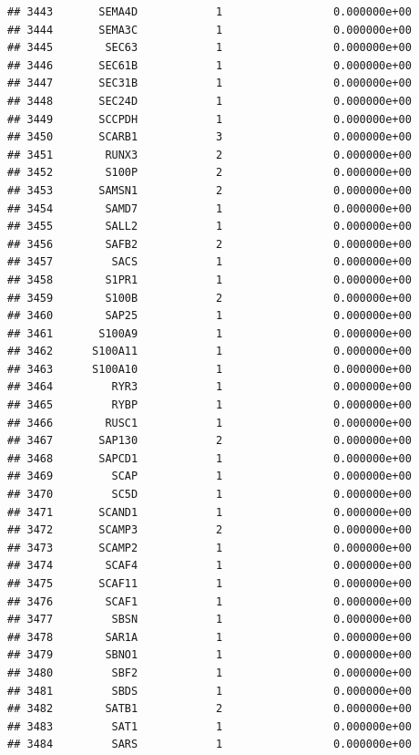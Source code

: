 \documentclass[
]{article}
\begin{document}
\begin{verbatim}
## 3443       SEMA4D            1                 0.000000e+00
## 3444       SEMA3C            1                 0.000000e+00
## 3445        SEC63            1                 0.000000e+00
## 3446       SEC61B            1                 0.000000e+00
## 3447       SEC31B            1                 0.000000e+00
## 3448       SEC24D            1                 0.000000e+00
## 3449       SCCPDH            1                 0.000000e+00
## 3450       SCARB1            3                 0.000000e+00
## 3451        RUNX3            2                 0.000000e+00
## 3452        S100P            2                 0.000000e+00
## 3453       SAMSN1            2                 0.000000e+00
## 3454        SAMD7            1                 0.000000e+00
## 3455        SALL2            1                 0.000000e+00
## 3456        SAFB2            2                 0.000000e+00
## 3457         SACS            1                 0.000000e+00
## 3458        S1PR1            1                 0.000000e+00
## 3459        S100B            2                 0.000000e+00
## 3460        SAP25            1                 0.000000e+00
## 3461       S100A9            1                 0.000000e+00
## 3462      S100A11            1                 0.000000e+00
## 3463      S100A10            1                 0.000000e+00
## 3464         RYR3            1                 0.000000e+00
## 3465         RYBP            1                 0.000000e+00
## 3466        RUSC1            1                 0.000000e+00
## 3467       SAP130            2                 0.000000e+00
## 3468       SAPCD1            1                 0.000000e+00
## 3469         SCAP            1                 0.000000e+00
## 3470         SC5D            1                 0.000000e+00
## 3471       SCAND1            1                 0.000000e+00
## 3472       SCAMP3            2                 0.000000e+00
## 3473       SCAMP2            1                 0.000000e+00
## 3474        SCAF4            1                 0.000000e+00
## 3475       SCAF11            1                 0.000000e+00
## 3476        SCAF1            1                 0.000000e+00
## 3477         SBSN            1                 0.000000e+00
## 3478        SAR1A            1                 0.000000e+00
## 3479        SBNO1            1                 0.000000e+00
## 3480         SBF2            1                 0.000000e+00
## 3481         SBDS            1                 0.000000e+00
## 3482        SATB1            2                 0.000000e+00
## 3483         SAT1            1                 0.000000e+00
## 3484         SARS            1                 0.000000e+00

\end{verbatim}
\end{document}
